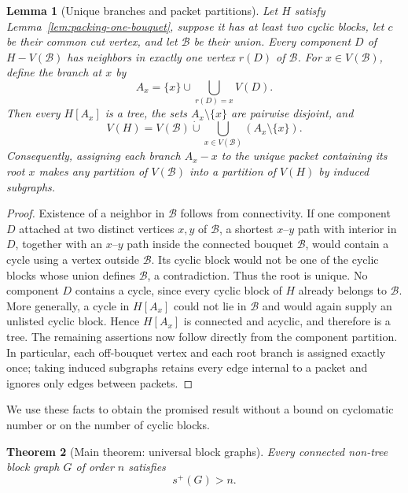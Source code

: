 \documentclass[11pt]{article}
\newtheorem{theorem}{Theorem}[section]
\newtheorem{lemma}[theorem]{Lemma}
\theoremstyle{definition}
\theoremstyle{remark}
\begin{document}
\begin{lemma}[Unique branches and packet partitions]
\label{lem:bouquet-partition}
Let $H$ satisfy Lemma~\ref{lem:packing-one-bouquet}, suppose it has at least
two cyclic blocks, let $c$ be their common cut vertex, and let $\mathcal B$
be their union.  Every component $D$ of $H-V(\mathcal B)$ has neighbors in
exactly one vertex $r(D)$ of $\mathcal B$.  For $x\in V(\mathcal B)$, define
the branch at $x$ by
\[
 A_x=\{x\}\cup\bigcup_{r(D)=x}V(D).
\]
Then every $H[A_x]$ is a tree, the sets $A_x\setminus\{x\}$ are pairwise
disjoint, and
\[
 V(H)=V(\mathcal B)\mathbin{\dot\cup}
       \bigcup_{x\in V(\mathcal B)}(A_x\setminus\{x\}).
\]
Consequently, assigning each branch $A_x- x$ to the unique packet containing
its root $x$ makes any partition of $V(\mathcal B)$ into a partition of
$V(H)$ by induced subgraphs.
\end{lemma}

\begin{proof}
Existence of a neighbor in $\mathcal B$ follows from connectivity.  If one
component $D$ attached at two distinct vertices $x,y$ of $\mathcal B$, a
shortest $x$--$y$ path with interior in $D$, together with an $x$--$y$ path
inside the connected bouquet $\mathcal B$, would contain a cycle using a
vertex outside $\mathcal B$.  Its cyclic block would not be one of the cyclic
blocks whose union defines $\mathcal B$, a contradiction.  Thus the root is
unique.  No component $D$ contains a cycle, since every cyclic block of $H$
already belongs to $\mathcal B$.
More generally, a cycle in $H[A_x]$ could not lie in $\mathcal B$ and would
again supply an unlisted cyclic block.  Hence $H[A_x]$ is connected and
acyclic, and therefore is a tree.
The remaining assertions now follow directly from the component partition.
In particular, each off-bouquet vertex and each root branch is assigned
exactly once; taking induced subgraphs retains every edge internal to a
packet and ignores only edges between packets.
\end{proof}

We use these facts to obtain the promised result without a bound on
cyclomatic number or on the number of cyclic blocks.

\begin{theorem}[Main theorem: universal block graphs]
\label{thm:universal-block}
Every connected non-tree block graph $G$ of order $n$ satisfies
\[
 s^+(G)>n.
\]
\end{theorem}
\end{document}
